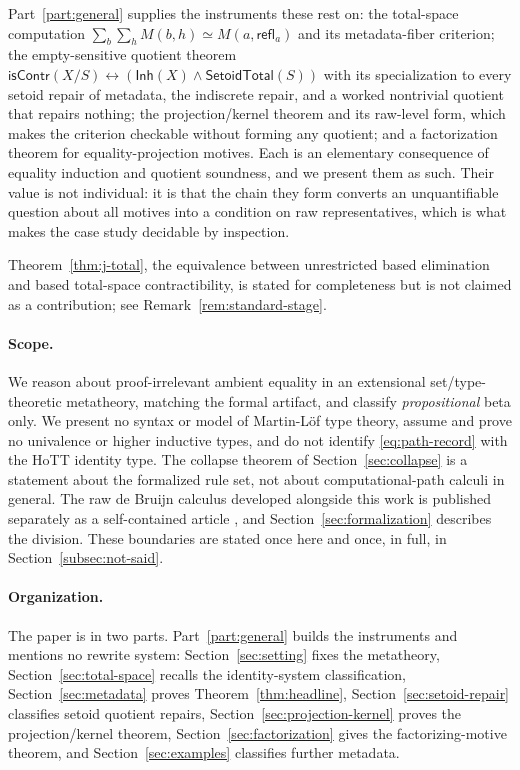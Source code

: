 \documentclass[10pt,reqno]{amsart}
\newcommand{\isContr}{\mathsf{isContr}}
\newcommand{\Eqv}{\simeq}
\newcommand{\refl}{\mathsf{refl}}
\newcommand{\SetTot}{\mathsf{SetoidTotal}}
\begin{document}
Part~\ref{part:general} supplies the instruments these rest on: the
total-space computation \(\sum_b\sum_hM(b,h)\Eqv M(a,\refl_a)\) and its
metadata-fiber criterion; the empty-sensitive quotient theorem
\(\isContr(X/S)\leftrightarrow(\mathsf{Inh}(X)\wedge\SetTot(S))\) with its
specialization to every setoid repair of metadata, the indiscrete repair, and a
worked nontrivial quotient that repairs nothing; the projection/kernel theorem
and its raw-level form, which makes the criterion checkable without forming any
quotient; and a factorization theorem for equality-projection motives.  Each is
an elementary consequence of equality induction and quotient soundness, and we
present them as such.  Their value is not individual: it is that the chain they
form converts an unquantifiable question about all motives into a condition on
raw representatives, which is what makes the case study decidable by
inspection.

Theorem~\ref{thm:j-total}, the equivalence between unrestricted based
elimination and based total-space contractibility, is stated for completeness
but is not claimed as a contribution; see Remark~\ref{rem:standard-stage}.

\paragraph{Scope.}
We reason about proof-irrelevant ambient equality in an extensional
set/type-theoretic metatheory, matching the formal artifact, and classify
\emph{propositional} beta only.  We present no syntax or model of
Martin-L\"of type theory, assume and prove no univalence or higher
inductive types, and do not identify \eqref{eq:path-record} with the HoTT
identity type.  The collapse theorem of Section~\ref{sec:collapse} is a
statement about the formalized rule set, not about computational-path calculi in
general.  The raw de Bruijn calculus developed alongside this work is published
separately as a self-contained article \cite{ScopedTraceCalculus2026}, and
Section~\ref{sec:formalization} describes the division.  These boundaries are
stated once here and once, in full, in Section~\ref{subsec:not-said}.

\paragraph{Organization.}
The paper is in two parts.  Part~\ref{part:general} builds the instruments and
mentions no rewrite system: Section~\ref{sec:setting} fixes the metatheory,
Section~\ref{sec:total-space} recalls the identity-system classification,
Section~\ref{sec:metadata} proves Theorem~\ref{thm:headline},
Section~\ref{sec:setoid-repair} classifies setoid quotient repairs,
Section~\ref{sec:projection-kernel} proves the projection/kernel theorem,
Section~\ref{sec:factorization} gives the factorizing-motive theorem, and
Section~\ref{sec:examples} classifies further metadata.
\end{document}
